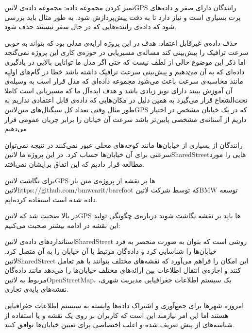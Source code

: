  تمیز کردن مجموعه داده: مجموعه داده‌ی ‌لاتین{GPS} رانندگان دارای صفر و داده‌های پرت بسیاری است و نیاز دارد تا به دقت پیش‌پردازش شود. به طور مثال باید بررسی شود که داده‌ی راننده‌هایی که در حال سفر نیستند حذف شود.

 حذف داده‌ی غیرقابل اعتماد: هدف در این پروژه ارایه‌ی مدلی بود که بتواند به خوبی سرعت ترافیک را پیش‌بینی کند مساله‌ی مسیریابی در حوزه‌ی کاری این پروژه نمی‌گنجد اما ذکر این موضوع خالی از لطف نیست که حتی اگر مدل ما توانایی بالایی در یادگیری داده‌ای که به آن می‌ٔدهیم و پیش‌بینی سرعت ترافیک داشته باشد خطا در گام‌های اولیه مانند محاسبه‌ی سرعت باعث می‌شود مجموعه داده‌ای که مدل قرار است به وسیله‌ی آن آموزش ببیند دارای نویز زیادی باشد و هدف ایده‌آل ما که مسیریابی است کاملا تحت‌الشعاع قرار می‌گیرد به همین دلیل در مکان‌هایی که داده‌ی قابل اعتمادی نداریم به طور مثال وقتی تعداد کل سیگنال‌های متن‌لاتین{GPS} که در یک خیابان مشخص در اختیار داریم از آستانه‌ی مشخصی پایین‌تر باشد سرعت آن خیابان را برابر جریان عمومی قرار می‌دهیم

 رانندگان از بسیاری از خیابان‌ها مانند کوچه‌های محلی  عبور نمی‌کنند در نتیجه نمی‌توان سرعتی برای آن خیابان‌ها حساب کرد. در این پروژه ما ‌لاتین{SharedStreet}‌هایی را مورد مطالعه قرار دادیم که این اتفاق برایشان نمی‌افتد.

 برای نگاشت ‌لاتین{GPS} ها بر نقشه از پروژه‌ی متن باز ‌لاتین{https://github.com/bmwcarit/barefoot} که توسط شرکت ‌لاتین{BMW} توسعه داده شده است استفاده کرده‌ایم.


در بالا صحبت شد که ‌لاتین{GPS} ها باید بر نقشه نگاشت شوند درباره‌ی چگونگی تولید این نقشه در ادامه بیشتر صحبت می‌کنیم:


استانداردهای داده‌ی ‌لاتین{SharedStreet} روشی است که بتوان به صورت منحصر به فرد خیابان‌ها را شناسایی کرد و داده‌گان مرتبط با آن خیابان را به آن متصل کرد. ‌لاتین{SharedStreet} این امکان را فراهم می‌آورد که نقشه‌های مختلف بتوانند با هم تعامل کنند و اجازه‌ی انتقال اطلاعات بین ارائه‌های مختلف خیابان‌ها را می‌دهد مانند داده‌گان مربوط به ‌لاتین{OpenStreetMap}، یک سیستم اطلاعات جغرافیایی مدیریت شهری، نقشه‌های پایه‌ی تجاری.

امروزه شهرها برای جمع‌آوری و اشتراک داده‌ها وابسته به سیستم اطلاعات جغرافیایی هستند اما این امر نیازمند این است که کاربران بر روی یک نقشه و یا استفاده از شناسه‌های از پیش تعریف شده و اغلب اختصاصی برای تعیین خیابان‌ها توافق کنند.

